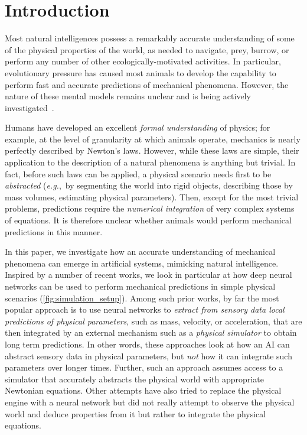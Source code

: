 \section{Introduction}\label{sec:introduction}

Most natural intelligences possess a remarkably accurate understanding of some of the physical properties of the world, as needed to navigate, prey, burrow, or perform any number of other ecologically-motivated activities. In particular, evolutionary pressure has caused most animals to develop the capability to perform fast and accurate predictions of mechanical phenomena. However, the nature of these mental models remains unclear and is being actively investigated~\cite{mentalModel}. 


Humans have developed an excellent \emph{formal understanding} of physics; for example, at the level of granularity at which animals operate, mechanics is nearly perfectly described by Newton's laws. However, while these laws are simple, their application to the description of a natural phenomena is anything but trivial. In fact, before such laws can be applied, a physical scenario needs first to be \emph{abstracted} (\textit{e.g.},\ by segmenting the world into rigid objects, describing those by mass volumes, estimating physical parameters). Then, except for the most trivial problems, predictions require the \emph{numerical integration} of very complex systems of equations. It is therefore unclear whether animals would perform mechanical predictions in this manner.

In this paper, we investigate how an accurate understanding of mechanical phenomena can emerge in artificial systems, mimicking natural intelligence. Inspired by a number of recent works, we look in particular at how deep neural networks can be used to perform mechanical predictions in simple physical scenarios (\cref{fig:simulation_setup}). Among such prior works, by far the most popular approach is to use neural networks \cite{phys101} to \emph{extract from sensory data local predictions of physical parameters}, such as mass, velocity, or acceleration, that are then integrated by an external mechanism such as a \emph{physical simulator} to obtain long term predictions. In other words, these approaches look at how an AI can abstract sensory data in physical parameters, but {\em not} how it can integrate such parameters over longer times. Further, such an approach assumes access to a simulator that accurately abstracts the physical world with appropriate Newtonian equations. Other attempts have also tried to replace the physical engine with a neural network \cite{battaglia2016interaction} but did not really attempt to observe the physical world and deduce properties from it but rather to integrate the physical equations.

